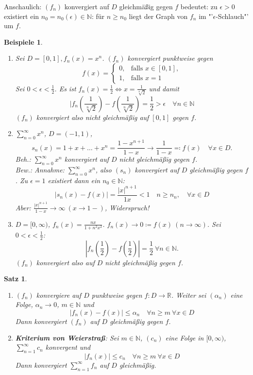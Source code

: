 \documentclass[titlepage,ngerman,a4paper,headsepline]{scrartcl}
\newcommand{\N}{\mathbb{N}}
\newcommand{\R}{\mathbb{R}}
\theoremstyle{named}
\theoremstyle{dotless}
\newtheorem{satz}[namedtheorem]{Satz}
\newtheorem*{beispiele}{Beispiele}
\begin{document}
Anschaulich: $(f_{n})$ konvergiert auf $D$ gleichmä{\ss}ig gegen $f$ bedeutet: zu $\epsilon > 0$ existiert ein $n_{0} = n_{0}(\epsilon) \in \N$: für $n \geq n_{0}$ liegt der Graph von $f_{n}$ im "'$\epsilon$-Schlauch"' um $f$.

\begin{beispiele} ~\
	\begin{enumerate}
		\item Sei $D = [0, 1], f_{n}(x) = x^{n}$. $(f_{n})$ konvergiert punktweise gegen 
			$$ f(x) = \begin{cases} 0, & \text{falls } x \in [0, 1], \\ 1, & \text{falls } x = 1 \end{cases} $$
			Sei $0 < \epsilon < \frac{1}{2}$. Es ist $f_{n}(x) = \frac{1}{2} \iff x = \frac{1}{\sqrt[n]{2}}$ und damit
				$$ |f_{n}(\frac{1}{\sqrt[n]{2}}) - f(\frac{1}{\sqrt[n]{2}}) = \frac{1}{2} > \epsilon \quad \forall n \in \N $$
			$(f_{n})$ konvergiert also nicht gleichmä{\ss}ig auf $[0, 1]$ gegen $f$.
		\item $\sum_{n=0}^{\infty} x^{n}$, $D = (-1, 1)$, 
			$$ s_{n}(x) = 1 + x + \dotsc + x^{n} = \frac{1 - x^{n+1}}{1 - x} \rightarrow \frac{1}{1 - x} \eqqcolon f(x) \quad \forall x \in D. $$
			Beh.: $\sum_{n=0}^{\infty} x^{n}$ konvergiert auf $D$ nicht gleichmä{\ss}ig gegen $f$. \\
			Bew.: Annahme: $\sum_{n=0}^{\infty} x^{n}$, also $(s_{n})$ konvergiert auf $D$ gleichmä{\ss}ig gegen $f$. Zu $\epsilon = 1$ existiert dann ein $n_{0} \in \N$:
			$$ | s_{n}(x) - f(x) | = \frac{|x|^{n+1}}{1  x} < 1 \quad n \geq n_{n}, \quad \forall x \in D $$
			Aber: $\frac{|x|^{n+1}}{1 - x} \rightarrow \infty ~(x \rightarrow 1-)$, Widerspruch!
		\item $D = [0, \infty)$, $f_{n}(x) = \frac{nx}{1 + n^{2} x^{2}}$. $f_{n}(x) \rightarrow 0 \coloneqq f(x) ~(n \rightarrow \infty)$. Sei $0 < \epsilon < \frac{1}{2}$: 
			$$ |f_{n}(\frac{1}{2}) - f(\frac{1}{2})| = \frac{1}{2} ~\forall n \in \N. $$
			$(f_{n})$ konvergiert also auf $D$ nicht gleichmäßig gegen $f$.
	\end{enumerate}	
\end{beispiele}

\begin{satz} ~\ \label{8.1:satz}
	\begin{enumerate}
		\item $(f_{n})$ konvergiere auf $D$ punktweise gegen $f \colon D \rightarrow \R$. Weiter sei $(\alpha_{n})$ eine Folge, $\alpha_{n} \rightarrow 0$, $m \in \N$ und
			$$ |f_{n}(x) - f(x) | \leq \alpha_{n} \quad \forall n \geq m ~\forall x \in D $$
			Dann konvergiert $(f_{n})$ auf $D$ gleichmä{\ss}ig gegen $f$. \label{8.1.a:satz}
		\item \textbf{Kriterium von Weierstra{\ss}}: Sei $m \in \N$, $(c_{n})$ eine Folge in $[0, \infty)$, $\sum_{n=1}^{\infty} c_{n}$ konvergent und
			$$ | f_{n}(x) | \leq c_{n} \quad \forall n \geq m ~\forall x \in D $$
			Dann konvergiert $\sum_{n=1}^{\infty} f_{n}$ auf $D$ gleichmä{\ss}ig. \label{8.1.b:satz}
	\end{enumerate}
\end{satz}
\end{document}
